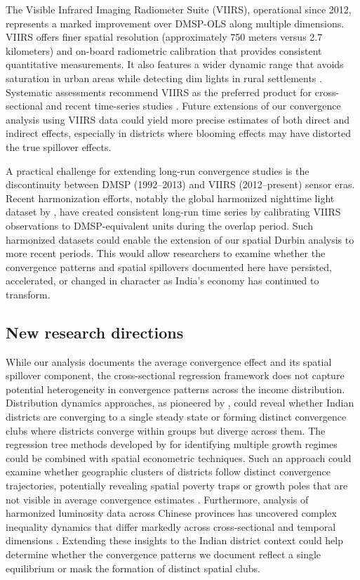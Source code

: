 \documentclass[
  a4paper, 
  twoside,
  review
]{article}
\begin{document}
The Visible Infrared Imaging Radiometer Suite (VIIRS), operational since
2012, represents a marked improvement over DMSP-OLS along multiple
dimensions. VIIRS offers finer spatial resolution (approximately 750
meters versus 2.7 kilometers) and on-board radiometric calibration that
provides consistent quantitative measurements. It also features a wider
dynamic range that avoids saturation in urban areas while detecting dim
lights in rural settlements \citep{elvidge_etal_viirs}. Systematic
assessments recommend VIIRS as the preferred product for cross-sectional
and recent time-series studies \citep{gibson_etal_ntl_measurement}.
Future extensions of our convergence analysis using VIIRS data could
yield more precise estimates of both direct and indirect effects,
especially in districts where blooming effects may have distorted the
true spillover effects.

A practical challenge for extending long-run convergence studies is the
discontinuity between DMSP (1992--2013) and VIIRS (2012--present) sensor
eras. Recent harmonization efforts, notably the global harmonized
nighttime light dataset by \citet{li_etal_harmonization}, have created
consistent long-run time series by calibrating VIIRS observations to
DMSP-equivalent units during the overlap period. Such harmonized
datasets could enable the extension of our spatial Durbin analysis to
more recent periods. This would allow researchers to examine whether the
convergence patterns and spatial spillovers documented here have
persisted, accelerated, or changed in character as India's economy has
continued to transform.

\subsection{New research directions}\label{new-research-directions}

While our analysis documents the average convergence effect and its
spatial spillover component, the cross-sectional regression framework
does not capture potential heterogeneity in convergence patterns across
the income distribution. Distribution dynamics approaches, as pioneered
by \citet{quah_twin_peaks}, could reveal whether Indian districts are
converging to a single steady state or forming distinct convergence
clubs where districts converge within groups but diverge across them.
The regression tree methods developed by
\citet{durlauf_johnson_convergence_clubs} for identifying multiple
growth regimes could be combined with spatial econometric techniques.
Such an approach could examine whether geographic clusters of districts
follow distinct convergence trajectories, potentially revealing spatial
poverty traps or growth poles that are not visible in average
convergence estimates \citep{rey_spatial_dynamics}. Furthermore,
analysis of harmonized luminosity data across Chinese provinces has
uncovered complex inequality dynamics that differ markedly across
cross-sectional and temporal dimensions
\citep{glawe_mendez_china_luminosity}. Extending these insights to the
Indian district context could help determine whether the convergence
patterns we document reflect a single equilibrium or mask the formation
of distinct spatial clubs.
\end{document}
